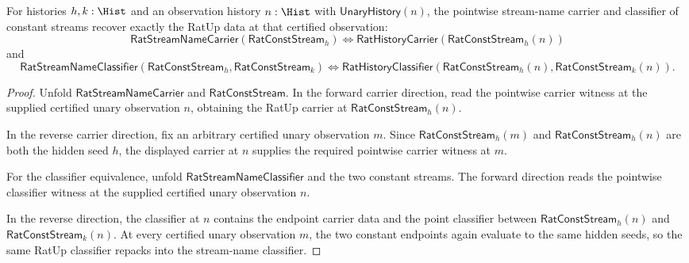 \begin{theorem}
\label{thm:rat-stream-name-constant-arbitrary-observation-exactness}
For histories $h,k:\Hist$ and an observation history $n:\Hist$ with
$\mathsf{UnaryHistory}(n)$, the pointwise stream-name carrier and classifier of
constant streams recover exactly the RatUp data at that certified observation:
$$
\mathsf{RatStreamNameCarrier}(\mathsf{RatConstStream}_h)
\Longleftrightarrow
\mathsf{RatHistoryCarrier}(\mathsf{RatConstStream}_h(n))
$$
and
$$
\mathsf{RatStreamNameClassifier}(\mathsf{RatConstStream}_h,
\mathsf{RatConstStream}_k)
\Longleftrightarrow
\mathsf{RatHistoryClassifier}(\mathsf{RatConstStream}_h(n),
\mathsf{RatConstStream}_k(n)).
$$
\end{theorem}
\begin{proof}
Unfold $\mathsf{RatStreamNameCarrier}$ and $\mathsf{RatConstStream}$. In the
forward carrier direction, read the pointwise carrier witness at the supplied
certified unary observation $n$, obtaining the RatUp carrier at
$\mathsf{RatConstStream}_h(n)$.

In the reverse carrier direction, fix an arbitrary certified unary observation
$m$. Since $\mathsf{RatConstStream}_h(m)$ and $\mathsf{RatConstStream}_h(n)$
are both the hidden seed $h$, the displayed carrier at $n$ supplies the
required pointwise carrier witness at $m$.

For the classifier equivalence, unfold $\mathsf{RatStreamNameClassifier}$ and
the two constant streams. The forward direction reads the pointwise classifier
witness at the supplied certified unary observation $n$.

In the reverse direction, the classifier at $n$ contains the endpoint carrier
data and the point classifier between $\mathsf{RatConstStream}_h(n)$ and
$\mathsf{RatConstStream}_k(n)$. At every certified unary observation $m$, the
two constant endpoints again evaluate to the same hidden seeds, so the same
RatUp classifier repacks into the stream-name classifier.
\end{proof}

